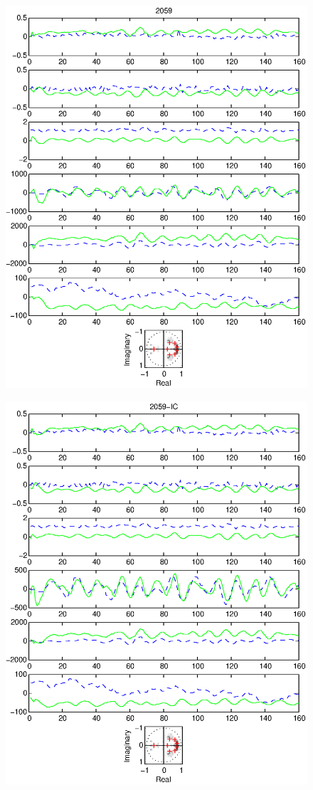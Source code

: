 \documentclass{article}
\begin{document}
\begin{figure}[htb!]\centering
\includegraphics{2059.eps}
\end{figure}\clearpage
\begin{figure}[htb!]\centering
\includegraphics{2059_ic.eps}
\end{figure}\clearpage
\end{document}

